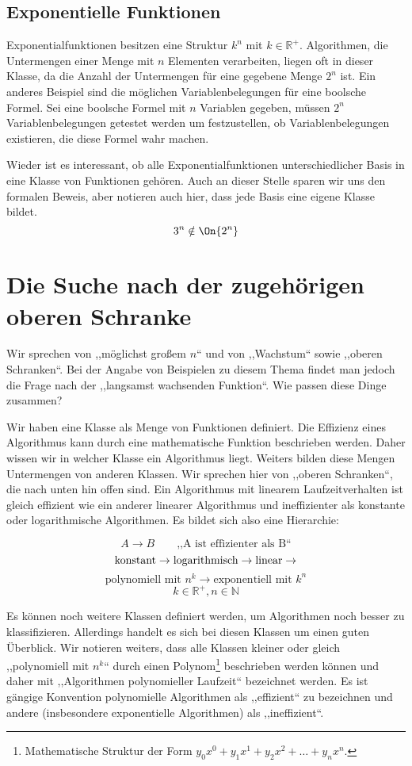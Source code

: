 \subsection{Exponentielle Funktionen}
%
Exponentialfunktionen besitzen eine Struktur $k^n$ mit $k \in \mathbb{R}^+$. Algorithmen, die Untermengen einer Menge mit $n$ Elementen verarbeiten, liegen oft in dieser Klasse, da die Anzahl der Untermengen für eine gegebene Menge $2^n$ ist. Ein anderes Beispiel sind die möglichen Variablenbelegungen für eine boolsche Formel. Sei eine boolsche Formel mit $n$ Variablen gegeben, müssen $2^n$ Variablenbelegungen getestet werden um festzustellen, ob Variablenbelegungen existieren, die diese Formel wahr machen.

Wieder ist es interessant, ob alle Exponentialfunktionen unterschiedlicher Basis in eine Klasse von Funktionen gehören. Auch an dieser Stelle sparen wir uns den formalen Beweis, aber notieren auch hier, dass jede Basis eine eigene Klasse bildet.
\[
  3^n \notin \On{2^n}
\]
%
\section{Die Suche nach der zugehörigen oberen Schranke}
%
Wir sprechen von ,,möglichst großem $n$`` und von ,,Wachstum`` sowie ,,oberen Schranken``. Bei der Angabe von Beispielen zu diesem Thema findet man jedoch die Frage nach der ,,langsamst wachsenden Funktion``. Wie passen diese Dinge zusammen?

Wir haben eine Klasse als Menge von Funktionen definiert. Die Effizienz eines Algorithmus kann durch eine mathematische Funktion beschrieben werden. Daher wissen wir in welcher Klasse ein Algorithmus liegt. Weiters bilden diese Mengen Untermengen von anderen Klassen. Wir sprechen hier von ,,oberen Schranken``, die nach unten hin offen sind. Ein Algorithmus mit linearem Laufzeitverhalten ist gleich effizient wie ein anderer linearer Algorithmus und ineffizienter als konstante oder logarithmische Algorithmen. Es bildet sich also eine Hierarchie:

\[
  A \rightarrow B \qquad \text{,,A ist effizienter als B``}
\] \[
  \text{konstant} \rightarrow
  \text{logarithmisch} \rightarrow
  \text{linear} \rightarrow
  \vspace{-8pt}
\] \[
  \text{polynomiell mit $n^k$} \rightarrow
  \text{exponentiell mit $k^n$}
\] \[
  k \in \mathbb{R}^+, n \in \mathbb{N}
\]

Es können noch weitere Klassen definiert werden, um Algorithmen noch besser zu klassifizieren. Allerdings handelt es sich bei diesen Klassen um einen guten Überblick. Wir notieren weiters, dass alle Klassen kleiner oder gleich ,,polynomiell mit $n^k$`` durch einen Polynom\footnote{Mathematische Struktur der Form $y_0x^0 + y_1x^1 + y_2x^2 + \ldots + y_nx^n$.} beschrieben werden können und daher mit ,,Algorithmen polynomieller Laufzeit`` bezeichnet werden. Es ist gängige Konvention polynomielle Algorithmen als ,,effizient`` zu bezeichnen und andere (insbesondere exponentielle Algorithmen) als ,,ineffizient``.

